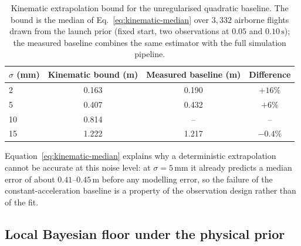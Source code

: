 \documentclass[11pt,a4paper]{article}
\begin{document}
\begin{table}[htbp]
  \centering
  \caption{Kinematic extrapolation bound for the unregularised quadratic baseline.
  The bound is the median of Eq.~\eqref{eq:kinematic-median} over $3{,}332$
  airborne flights drawn from the launch prior (fixed start, two observations at
  $0.05$ and $0.10\,\mathrm{s}$); the measured baseline combines the same
  estimator with the full simulation pipeline.}
  \label{tab:kinematic-bound}
  \begin{tabular}{lccc}
    \toprule
    $\sigma$ (mm) & Kinematic bound (m) & Measured baseline (m) & Difference \\
    \midrule
    2  & 0.163 & 0.190 & $+16\%$ \\
    5  & 0.407 & 0.432 & $+6\%$  \\
    10 & 0.814 & --    & --      \\
    15 & 1.222 & 1.217 & $-0.4\%$ \\
    \bottomrule
  \end{tabular}
\end{table}

Equation~\eqref{eq:kinematic-median} explains why a deterministic extrapolation
cannot be accurate at this noise level: at $\sigma=5\,\mathrm{mm}$ it already
predicts a median error of about $0.41$--$0.45\,\mathrm{m}$ before any modelling
error, so the failure of the constant-acceleration baseline is a property of the
observation design rather than of the fit.

\subsection{Local Bayesian floor under the physical prior}
\end{document}
